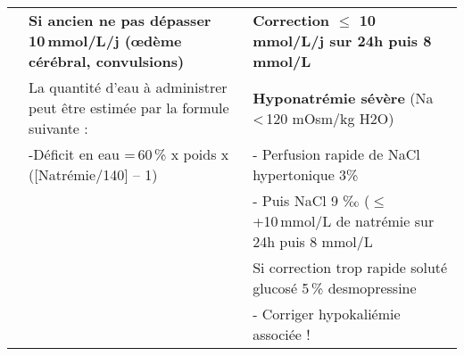 \documentclass[11pt]{article}
\begin{document}
\begin{table}
{\begin{tabular}{lll}
 & \textbf{Si ancien ne pas dépasser 10 mmol/L/j (œdème cérébral, convulsions)} & \textbf{Correction \(\le\) 10 mmol/L/j sur 24h puis 8 mmol/L}\\
 & La quantité d’eau à administrer peut être estimée par la formule suivante : & \textbf{Hyponatrémie sévère} (Na < 120 mOsm/kg H2O)\\
 & -Déficit en eau = 60 \% x poids x ([Natrémie/140] – 1) & - Perfusion rapide de NaCl hypertonique 3\%\\
 &  & - Puis NaCl 9 ‰ (\(\le\)  +10 mmol/L de natrémie sur 24h puis 8 mmol/L\\
 &  & Si correction trop rapide  soluté glucosé 5 \%  desmopressine\\
 &  & - Corriger  hypokaliémie associée !\\
\end{tabular}
}
\end{table}
\end{document}
